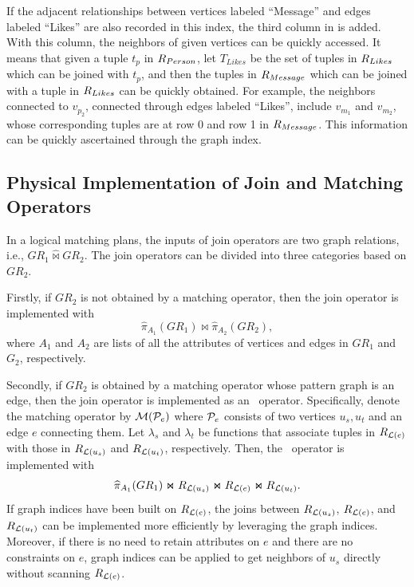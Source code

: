 If the adjacent relationships between vertices labeled ``Message'' and edges labeled ``Likes'' are also recorded in this index, the third column in  is added.
With this column, the neighbors of given vertices can be quickly accessed.
It means that given a tuple $t_p$ in ${R_{Person}}$, let $T_{Likes}$ be the set of tuples in ${R_{Likes}}$ which can be joined with $t_p$, and then the tuples in ${R_{Message}}$ which can be joined with a tuple in ${R_{Likes}}$ can be quickly obtained.
For example, the neighbors connected to $v_{p_2}$, connected through edges labeled ``Likes'', include $v_{m_1}$ and $v_{m_2}$, whose corresponding tuples are at row 0 and row 1 in ${R_{Message}}$.
This information can be quickly ascertained through the graph index.

\subsection{Physical Implementation of Join and Matching Operators}
\label{sec:join-matching-operator}
In a logical matching plans, the inputs of join operators are two graph relations, i.e., $GR_1 \widehat{\Join} GR_2$.
The join operators can be divided into three categories based on $GR_2$.

Firstly, if $GR_2$ is not obtained by a matching operator, then the join operator is implemented with 
\begin{equation*}
    \widehat{\pi}_{A_1}(GR_1) \Join \widehat{\pi}_{A_2}(GR_2),
\end{equation*}
where $A_1$ and $A_2$ are lists of all the attributes of vertices and edges in $GR_1$ and $G_2$, respectively.

Secondly, if $GR_2$ is obtained by a matching operator whose pattern graph is an edge, then the join operator is implemented as an \expandvertex~operator. 
Specifically, denote the matching operator by $\mathcal{M}(\mathcal{P}_e)$ where $\mathcal{P}_e$ consists of two vertices $u_s, u_t$ and an edge $e$ connecting them.
Let $\lambda_s$ and $\lambda_t$ be functions that associate tuples in ${R_{\mathcal{L}{(e)}}}$ with those in ${R_{\mathcal{L}(u_s)}}$ and ${R_{\mathcal{L}(u_t)}}$, respectively.
Then, the \expandvertex~operator is implemented with 
\begin{equation*}
    \widehat{\pi}_{A_1}(GR_1) \Join {\ensuremath R_{\mathcal{L}{(u_s)}}} \Join {\ensuremath R_{\mathcal{L}{(e)}}} \Join {\ensuremath R_{\mathcal{L}{(u_t)}}}.
\end{equation*}
If graph indices have been built on ${R_{\mathcal{L}(e)}}$, the joins between ${R_{\mathcal{L}(u_s)}}$, ${R_{\mathcal{L}(e)}}$, and ${R_{\mathcal{L}(u_t)}}$ can be implemented more efficiently by leveraging the graph indices.
Moreover, if there is no need to retain attributes on $e$ and there are no constraints on $e$, graph indices can be applied to get neighbors of $u_s$ directly without scanning ${R_{\mathcal{L}(e)}}$.

